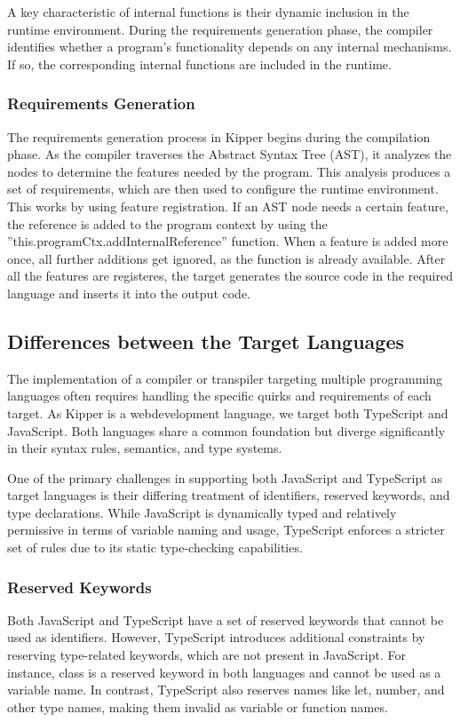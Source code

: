 A key characteristic of internal functions is their dynamic inclusion in the runtime environment. During the requirements generation phase, the compiler identifies whether a program's functionality depends on any internal mechanisms. If so, the corresponding internal functions are included in the runtime.

\subsubsection{Requirements Generation}
The requirements generation process in Kipper begins during the compilation phase. As the compiler traverses the Abstract Syntax Tree (AST), it analyzes the nodes to determine the features needed by the program. This analysis produces a set of requirements, which are then used to configure the runtime environment. This works by using feature registration. If an AST node needs a certain feature, the reference is added to the program context by using the ''this.programCtx.addInternalReference'' function. When a feature is added more once, all further additions get ignored, as the function is already available. After all the features are registeres, the target generates the source code in the required language and inserts it into the output code.

\subsection{Differences between the Target Languages}
The implementation of a compiler or transpiler targeting multiple programming languages often requires handling the specific quirks and requirements of each target. As Kipper is a webdevelopment language, we target both TypeScript and JavaScript. Both languages share a common foundation but diverge significantly in their syntax rules, semantics, and type systems.

One of the primary challenges in supporting both JavaScript and TypeScript as target languages is their differing treatment of identifiers, reserved keywords, and type declarations. While JavaScript is dynamically typed and relatively permissive in terms of variable naming and usage, TypeScript enforces a stricter set of rules due to its static type-checking capabilities.

\subsubsection{Reserved Keywords}
Both JavaScript and TypeScript have a set of reserved keywords that cannot be used as identifiers. However, TypeScript introduces additional constraints by reserving type-related keywords, which are not present in JavaScript. For instance, class is a reserved keyword in both languages and cannot be used as a variable name. In contrast, TypeScript also reserves names like let, number, and other type names, making them invalid as variable or function names.


